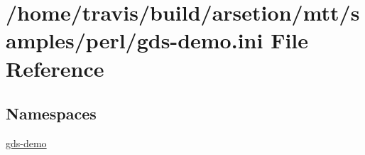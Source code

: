 \hypertarget{gds-demo_8ini}{\section{/home/travis/build/arsetion/mtt/samples/perl/gds-\/demo.ini File Reference}
\label{gds-demo_8ini}
}
\subsection*{Namespaces}
\begin{DoxyCompactItemize}
\item 
\hyperlink{namespacegds-demo}{gds-\/demo}
\end{DoxyCompactItemize}
